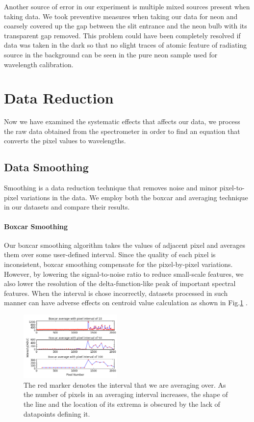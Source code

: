 \documentclass[authoryear, 12pt,5p, times]{elsarticle}
\begin{document}
Another source of error in our experiment is multiple mixed sources present when taking data. We took preventive measures when taking our data for neon and coarsely covered up the gap between the slit entrance and the neon bulb with its transparent gap removed. This problem could have been completely resolved if data was taken in the dark so that no slight traces of atomic feature of radiating source in the background can be seen in the pure neon sample used for wavelength calibration.
\section{Data Reduction}
 Now we have examined the systematic effects that affects our data, we process the raw data obtained from the spectrometer in order to find an equation that converts the pixel values to wavelengths.
  \subsection{Data Smoothing}
  Smoothing is a data reduction technique that removes noise and minor pixel-to-pixel variations in the data. We employ both the boxcar and averaging technique in our datasets and compare their results.
  \paragraph*{\textbf{Boxcar Smoothing}}
  Our boxcar smoothing algorithm takes the values of adjacent pixel and averages them over some user-defined interval. Since the quality of each pixel is inconsistent, boxcar smoothing compensate for the pixel-by-pixel variations.  However, by lowering the signal-to-noise ratio to reduce small-scale features, we also lower the resolution of the delta-function-like peak of important spectral features. When the interval is chose incorrectly, datasets processed in such manner can have adverse effects on centroid value calculation as shown in Fig.\ref{boxcar} .
 \begin{figure}[h!] 
\includegraphics[width=0.45\textwidth]{figures/boxcar}
\caption{The red marker denotes the interval that we are averaging over. As the number of pixels in an averaging interval increases, the shape of the line and the location of its extrema is obscured by the lack of datapoints defining it.}\label{boxcar}
\end{figure}
\end{document}
